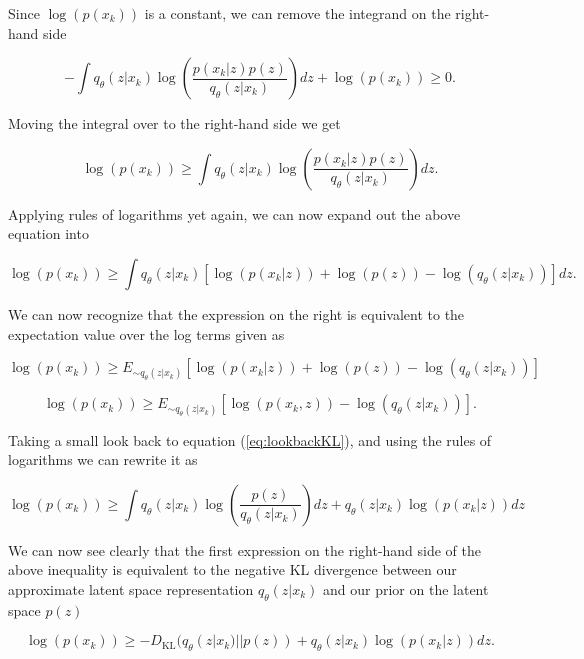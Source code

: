 Since $\log(p(x_k))$ is a constant, we can remove the integrand 
on the right-hand side

\begin{equation}
    -\int q_{\theta}(z|x_k)
    \log(\frac{p(x_k|z) p(z)}{q_{\theta}(z|x_k)})dz +
    \log(p(x_k)) \geq 0.
\end{equation}

Moving the integral over to the right-hand side we get 

\begin{equation}
    \log(p(x_k)) \geq \int q_{\theta}(z|x_k)
    \log(\frac{p(x_k|z) p(z)}{q_{\theta}(z|x_k)})dz.\label{eq:lookbackKL}
\end{equation}

Applying rules of logarithms yet again, we can now expand 
out the above equation into 

\begin{equation}
    \log(p(x_k)) \geq \int q_{\theta}(z|x_k)
    [\log(p(x_k|z)) + \log(p(z)) - \log(q_{\theta}(z|x_k))] dz.
\end{equation}

We can now recognize that the expression on the right 
is equivalent to the expectation value over the log 
terms given as 

\begin{equation}
    \log(p(x_k)) \geq E_{\sim q_{\theta}(z|x_k)} 
    [\log(p(x_k|z)) + \log(p(z)) - \log(q_{\theta}(z|x_k))]
\end{equation}

\begin{equation}
    \log(p(x_k)) \geq E_{\sim q_{\theta}(z|x_k)} 
    [\log(p(x_k,z)) - \log(q_{\theta}(z|x_k))].
\end{equation}

Taking a small look back to equation (\ref{eq:lookbackKL}), 
and using the rules of logarithms we can rewrite it as 

\begin{equation}
    \log(p(x_k)) \geq \int q_{\theta}(z|x_k)
    \log(\frac{p(z)}{q_{\theta}(z|x_k)})dz + 
    q_{\theta}(z|x_k) \log({p(x_k|z)}) dz
\end{equation}

We can now see clearly that the first expression on the 
right-hand side of the above inequality is equivalent to the 
negative \ac{KL} divergence between our approximate latent space 
representation $q_{\theta}(z|x_k)$ and our prior on 
the latent space $p(z)$

\begin{equation}
    \log(p(x_k)) \geq - D_{\textrm{KL}}(q_{\theta}(z|x_k) || p(z)) + 
    q_{\theta}(z|x_k) \log({p(x_k|z)}) dz. 
\end{equation}

